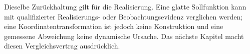 Dieselbe Zurückhaltung gilt für die Realisierung. Eine glatte Sollfunktion
kann mit qualifizierter Realisierungs- oder Beobachtungsevidenz verglichen
werden; eine Koordinatentransformation ist jedoch keine Konstruktion und eine
gemessene Abweichung keine dynamische Ursache. Das nächste Kapitel macht
diesen Vergleichsvertrag ausdrücklich.

\label{prop:spectral-smoothing}
\label{princ:realization-survival}
\label{def:runtime-smoothness}

